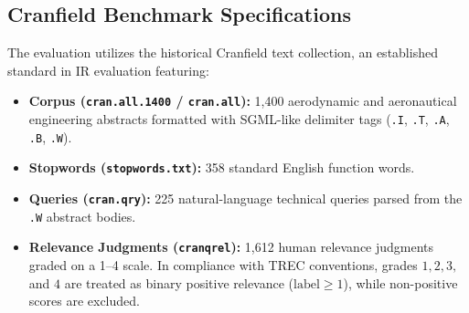 \documentclass[10pt, a4paper]{article}
\begin{document}
\subsection{Cranfield Benchmark Specifications}
The evaluation utilizes the historical Cranfield text collection, an established standard in IR evaluation featuring:
\begin{itemize}[noitemsep,topsep=2pt]
    \item \textbf{Corpus (\texttt{cran.all.1400} / \texttt{cran.all}):} 1,400 aerodynamic and aeronautical engineering abstracts formatted with SGML-like delimiter tags (\texttt{.I}, \texttt{.T}, \texttt{.A}, \texttt{.B}, \texttt{.W}).
    \item \textbf{Stopwords (\texttt{stopwords.txt}):} 358 standard English function words.
    \item \textbf{Queries (\texttt{cran.qry}):} 225 natural-language technical queries parsed from the \texttt{.W} abstract bodies.
    \item \textbf{Relevance Judgments (\texttt{cranqrel}):} 1,612 human relevance judgments graded on a 1--4 scale. In compliance with TREC conventions, grades $1, 2, 3,$ and $4$ are treated as binary positive relevance ($\text{label} \ge 1$), while non-positive scores are excluded.
\end{itemize}
\end{document}
